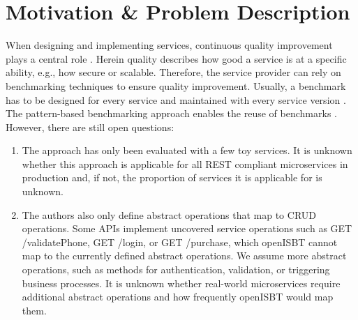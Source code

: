 \section{Motivation \& Problem Description}
\label{sec:motivation}
When designing and implementing services, continuous quality improvement plays a central role \cite[][p. 28]{Bermbach_Cloud_Service_Benchmarking_2017}. Herein quality describes how good a service is at a specific ability, e.g., how secure or scalable\cite[][p. 17]{Bermbach_Cloud_Service_Benchmarking_2017}. Therefore, the service provider can rely on benchmarking techniques to ensure quality improvement. 
Usually, a benchmark has to be designed for every service and maintained with every service version \cite[][sec. 1]{paper_grambow_benchmarking_microservices}. The pattern-based benchmarking approach enables the reuse of benchmarks \cite{paper_grambow_benchmarking_microservices}. However, there are still open questions:
\begin{enumerate}
\item The approach has only been evaluated with a few toy services. It is unknown whether this approach is applicable for all REST compliant microservices in production and, if not, the proportion of services it is applicable for is unknown.
\item The authors also only define abstract operations that map to CRUD operations. Some APIs implement uncovered service operations such as GET /validatePhone, GET /login, or GET /purchase, which openISBT cannot map to the currently defined abstract operations. We assume more abstract operations, such as methods for authentication, validation, or triggering business processes. It is unknown whether real-world microservices require additional abstract operations and how frequently openISBT would map them.
\end{enumerate}
